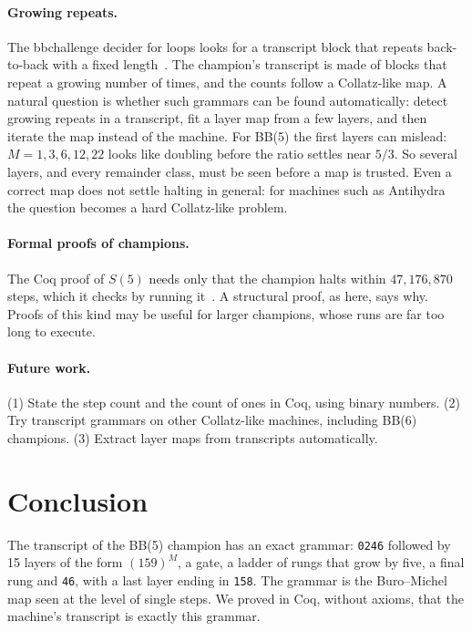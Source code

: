 \documentclass[11pt]{article}
\theoremstyle{definition}
\theoremstyle{remark}
\begin{document}
\paragraph{Growing repeats.} The bbchallenge decider for loops looks for a transcript
block that repeats back-to-back with a fixed length~\cite[Algorithm~1]{bbchallenge}. The
champion's transcript is made of blocks that repeat a growing number of times, and the
counts follow a Collatz-like map. A natural question is whether such grammars can be
found automatically: detect growing repeats in a transcript, fit a layer map from a few
layers, and then iterate the map instead of the machine. For BB(5) the first layers can
mislead: $M = 1,3,6,12,22$ looks like doubling before the ratio settles near $5/3$. So
several layers, and every remainder class, must be seen before a map is trusted. Even a
correct map does not settle halting in general: for machines such as
Antihydra~\cite{bbchallenge} the question becomes a hard Collatz-like problem.

\paragraph{Formal proofs of champions.} The Coq proof of $S(5)$ needs only that the
champion halts within $47{,}176{,}870$ steps, which it checks by running
it~\cite{bbchallenge}. A structural proof, as here, says why. Proofs of this kind may
be useful for larger champions, whose runs are far too long to execute.

\paragraph{Future work.} (1) State the step count and the count of ones in Coq, using
binary numbers. (2) Try transcript grammars on other Collatz-like machines, including
BB(6) champions. (3) Extract layer maps from transcripts automatically.

\section{Conclusion}

The transcript of the BB(5) champion has an exact grammar: \texttt{0246} followed by 15
layers of the form $(159)^M$, a gate, a ladder of rungs that grow by five, a final rung
and \texttt{46}, with a last layer ending in \texttt{158}. The grammar is the
Buro--Michel map seen at the level of single steps. We proved in Coq, without axioms,
that the machine's transcript is exactly this grammar.
\end{document}
